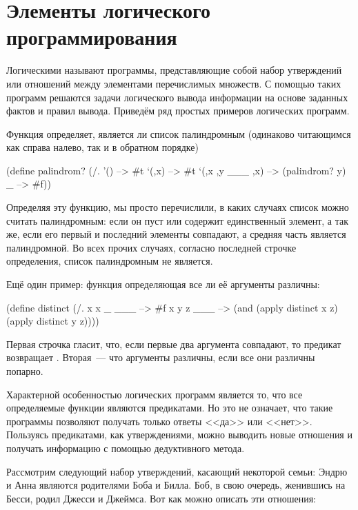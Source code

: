 \section{Элементы логического программирования}%
Логическими называют программы, представляющие собой набор утверждений или отношений между элементами перечислимых множеств. С помощью таких программ решаются задачи логического вывода информации на основе заданных фактов и правил вывода.
Приведём ряд простых примеров логических программ.

Функция  определяет, является ли список палиндромным (одинаково читающимся как справа налево, так и в обратном порядке)

\begin{SchemeCode}[emph={x,y}]
(define palindrom?
  (/. '() --> #t
      `(,x) --> #t
      `(,x ,y ___ ,x) --> (palindrom? y)
      _ --> #f))
\end{SchemeCode}

Определяя эту функцию, мы просто перечислили, в каких случаях список можно считать палиндромным: если он пуст или содержит единственный элемент, а так же, если его первый и последний элементы совпадают, а средняя часть является палиндромной. Во всех прочих случаях, согласно последней строчке определения, список палиндромным не является.

Ещё один пример: функция  определяющая все ли её аргументы различны:

\begin{SchemeCode}
(define distinct
  (/. x x _ ___ --> #f
      x y z ___ --> (and (apply distinct x z)
                         (apply distinct y z))))
\end{SchemeCode}

Первая строчка гласит, что, если первые два аргумента совпадают, то предикат возвращает . Вторая~--- что аргументы различны, если все они различны попарно.

Характерной особенностью логических программ является то, что все определяемые функции являются предикатами. Но это не означает, что такие программы позволяют получать только ответы <<да>> или <<нет>>. Пользуясь предикатами, как утверждениями, можно выводить новые отношения и получать информацию с помощью дедуктивного метода.

Рассмотрим следующий набор утверждений, касающий некоторой семьи:
Эндрю и Анна являются родителями Боба и Билла. Боб, в свою очередь, женившись на Бесси, родил Джесси и Джеймса. Вот как можно описать эти отношения:

